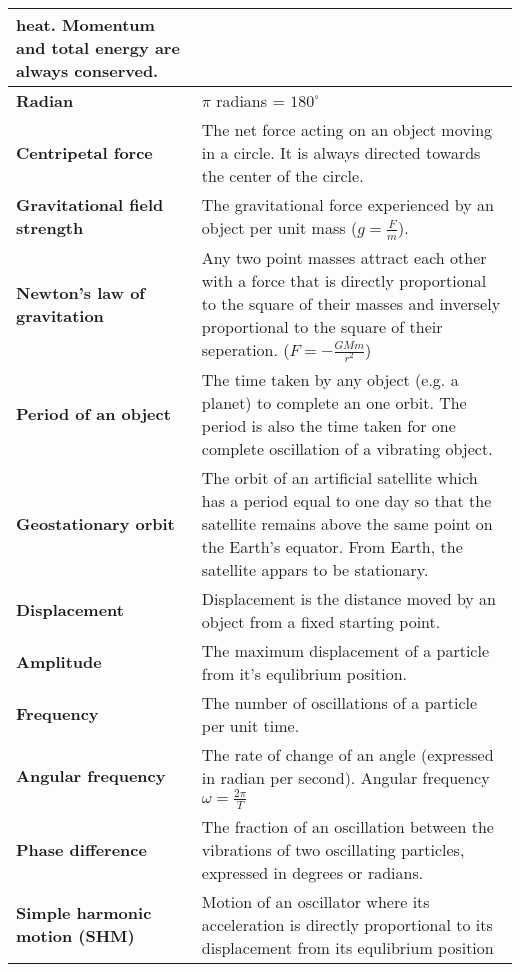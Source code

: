 \documentclass{article}
\begin{document}
\begin{longtable}{>{\bf\centering\arraybackslash}p{1in} 
  p{\textwidth-4\tabcolsep-1in}}
    heat. Momentum and total energy are always conserved.\\ \midrule
  Radian & $\pi$ radians = $180^\circ$\\ \midrule
  Centripetal force & The net force acting on an object moving in a circle. It 
    is always directed towards the center of the circle. \\ %
  Gravitational field strength & The gravitational force 
    experienced by an object per unit mass ($g = \frac{F}{m}$).\\ \midrule
  Newton's law of gravitation & Any two point masses attract each other with a
    force that is directly proportional to the square of their masses and
    inversely proportional to the square of their seperation. ($F = 
    -\frac{GMm}{r^2}$)\\ \midrule
  Period of an object & The time taken by any object (e.g. a planet) to complete
    an one orbit. \newline \newline The period is also the time taken for one
    complete oscillation of a vibrating object.\\ \midrule
  Geostationary orbit & The orbit of an artificial satellite which has a period
    equal to one day so that the satellite remains above the same point on the
    Earth's equator. \newline \newline From Earth, the satellite appars to be
    stationary.\\ \midrule
  Displacement & Displacement is the distance moved by an object from a fixed
    starting point.\\ \midrule
  Amplitude & The maximum displacement of a particle from it's equlibrium
    position.\\ \midrule
  Frequency & The number of oscillations of a particle per unit time.\\ \midrule
  Angular frequency & The rate of change of an angle (expressed in radian per 
    second). \newline \newline Angular frequency $\omega = \frac{2\pi}{T}$\\ 
    \midrule
  Phase difference & The fraction of an oscillation between the vibrations of
    two oscillating particles, expressed in degrees or radians.\\ \midrule
  Simple harmonic motion (SHM) & Motion of an oscillator where its acceleration
    is directly proportional to its displacement from its equlibrium position

\end{longtable}
\end{document}
